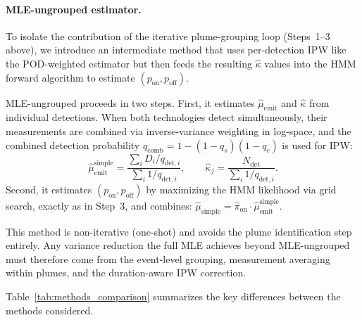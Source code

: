\documentclass[unnumsec,webpdf,modern,mediumone]{oup-authoring-template}
\begin{document}
\paragraph{MLE-ungrouped estimator.}
To isolate the contribution of the iterative plume-grouping loop (Steps~1--3 above), we introduce an intermediate method that uses per-detection IPW like the POD-weighted estimator but then feeds the resulting $\hat{\kappa}$ values into the HMM forward algorithm to estimate $(p_{\text{on}}, p_{\text{off}})$.

MLE-ungrouped proceeds in two steps. First, it estimates $\hat{\mu}_{\text{emit}}$ and $\hat{\kappa}$ from individual detections. When both technologies detect simultaneously, their measurements are combined via inverse-variance weighting in log-space, and the combined detection probability $q_{\text{comb}} = 1 - (1-q_s)(1-q_c)$ is used for IPW:
\begin{equation}
    \hat{\mu}_{\text{emit}}^{\text{simple}} = \frac{\sum_{i} D_i / q_{\text{det},i}}{\sum_{i} 1/q_{\text{det},i}},
    \qquad
    \hat{\kappa}_j = \frac{N_{\text{det}}}{\sum_{i} 1/q_{\text{det},i}}.
    \label{eq:mle_simple}
\end{equation}
Second, it estimates $(p_{\text{on}}, p_{\text{off}})$ by maximizing the HMM likelihood via grid search, exactly as in Step~3, and combines:
$\hat{\mu}_{\text{simple}} = \hat{\pi}_{\text{on}} \cdot \hat{\mu}_{\text{emit}}^{\text{simple}}$.

This method is non-iterative (one-shot) and avoids the plume identification step entirely. Any variance reduction the full MLE achieves beyond MLE-ungrouped must therefore come from the event-level grouping, measurement averaging within plumes, and the duration-aware IPW correction.

Table~\ref{tab:methods_comparison} summarizes the key differences between the methods considered.
\end{document}
